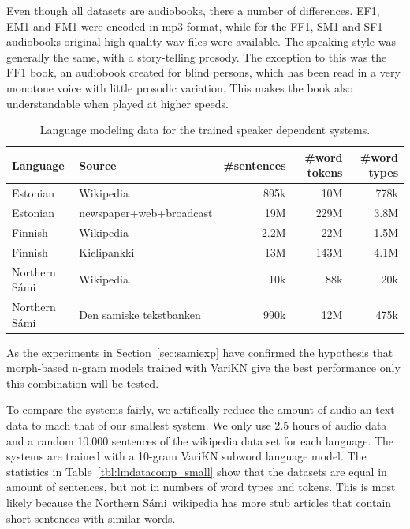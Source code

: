 \documentclass[b5paper]{article}
\newcommand{\ns}{Northern Sámi}
\begin{document}
Even though all datasets are audiobooks, there a number of differences. EF1, EM1 and FM1 were encoded in mp3-format, while for the FF1, SM1 and SF1 audiobooks original high quality wav files were available. The speaking style was generally the same, with a story-telling prosody. The exception to this was the FF1 book, an audiobook created for blind persons, which has been read in a very monotone voice with little prosodic variation. This makes the book also understandable when played at higher speeds.

\begin{table}[!h]
\centering
\begin{tabular}{llrrr}
\textbf{Language} & \textbf{Source} & \textbf{\#sentences} & \textbf{ \#word tokens} & \textbf{\#word types}\\\hline
Estonian & Wikipedia &  895k & 10M & 778k \\
 Estonian & newspaper+web+broadcast \cite{kurimo2015modeling} & 19M  & 229M  & 3.8M \\
 Finnish & Wikipedia &  2.2M  & 22M & 1.5M \\
 Finnish & Kielipankki & 13M &  143M & 4.1M \\
 \ns & Wikipedia & 10k & 88k & 20k\\
 \ns & Den samiske tekstbanken & 990k & 12M & 475k\\
\end{tabular}
\caption{Language modeling data for the trained speaker dependent systems.\label{tbl:lmdatacomp}}
\end{table}

As the experiments in Section~\ref{sec:samiexp} have confirmed the hypothesis that morph-based n-gram models trained with VariKN give the best performance only this combination will be tested.

To compare the systems fairly, we artifically reduce the amount of audio an text data to mach that of our smallest system. We only use 2.5 hours of audio data and a random 10.000 sentences of the wikipedia data set for each language. The systems are trained with a 10-gram VariKN subword language model. The statistics in Table~\ref{tbl:lmdatacomp_small} show that the datasets are equal in amount of sentences, but not in numbers of word types and tokens. This is most likely because the \ns\ wikipedia has more stub articles that contain short sentences with similar words.
\end{document}
